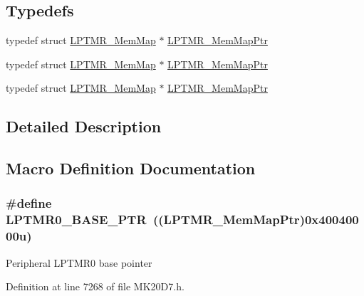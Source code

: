 \subsection*{Typedefs}
\begin{DoxyCompactItemize}
\item 
typedef struct \hyperlink{struct_l_p_t_m_r___mem_map}{L\+P\+T\+M\+R\+\_\+\+Mem\+Map} $\ast$ \hyperlink{group___l_p_t_m_r___peripheral_ga765226e2eeb35160c12820d4a2541320}{L\+P\+T\+M\+R\+\_\+\+Mem\+Map\+Ptr}
\item 
typedef struct \hyperlink{struct_l_p_t_m_r___mem_map}{L\+P\+T\+M\+R\+\_\+\+Mem\+Map} $\ast$ \hyperlink{group___l_p_t_m_r___peripheral_ga765226e2eeb35160c12820d4a2541320}{L\+P\+T\+M\+R\+\_\+\+Mem\+Map\+Ptr}
\item 
typedef struct \hyperlink{struct_l_p_t_m_r___mem_map}{L\+P\+T\+M\+R\+\_\+\+Mem\+Map} $\ast$ \hyperlink{group___l_p_t_m_r___peripheral_ga765226e2eeb35160c12820d4a2541320}{L\+P\+T\+M\+R\+\_\+\+Mem\+Map\+Ptr}
\end{DoxyCompactItemize}


\subsection{Detailed Description}


\subsection{Macro Definition Documentation}
\subsubsection[{\texorpdfstring{L\+P\+T\+M\+R0\+\_\+\+B\+A\+S\+E\+\_\+\+P\+TR}{LPTMR0_BASE_PTR}}]{\setlength{\rightskip}{0pt plus 5cm}\#define L\+P\+T\+M\+R0\+\_\+\+B\+A\+S\+E\+\_\+\+P\+TR~(({\bf L\+P\+T\+M\+R\+\_\+\+Mem\+Map\+Ptr})0x40040000u)}\hypertarget{group___l_p_t_m_r___peripheral_ga90a9194151ad11b422bcab162e797eda}{}\label{group___l_p_t_m_r___peripheral_ga90a9194151ad11b422bcab162e797eda}
Peripheral L\+P\+T\+M\+R0 base pointer 

Definition at line 7268 of file M\+K20\+D7.\+h.

